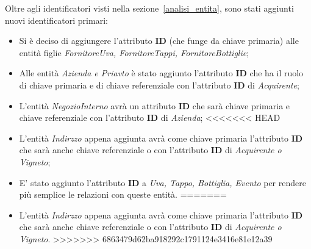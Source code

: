Oltre agli identificatori visti nella sezione~\ref{analisi_entita}, sono stati aggiunti nuovi identificatori primari:

\begin{itemize}
	\item Si è deciso di aggiungere l'attributo \textbf{ID} (che funge da chiave primaria) alle entità figlie \emph{FornitoreUva, FornitoreTappi, FornitoreBottiglie};
	\item Alle entità \emph{Azienda e Priavto} è stato aggiunto l'attributo \textbf{ID} che ha il ruolo di chiave primaria e di chiave referenziale con l'attributo \textbf{ID} di \emph{Acquirente};
	\item L'entità \emph{NegozioInterno} avrà un attributo \textbf{ID} che sarà chiave primaria e chiave referenziale con l'attributo \textbf{ID} di \emph{Azienda};
<<<<<<< HEAD
	\item L'entità \emph{Indirzzo} appena aggiunta avrà come chiave primaria l'attributo \textbf{ID} che sarà anche chiave referenziale o con l'attributo \textbf{ID} di \emph{Acquirente o Vigneto};
	\item E' stato aggiunto l'attributo \textbf{ID} a \emph{Uva, Tappo, Bottiglia, Evento} per rendere più semplice le relazioni con queste entità.
=======
	\item L'entità \emph{Indirzzo} appena aggiunta avrà come chiave primaria l'attributo \textbf{ID} che sarà anche chiave referenziale o con l'attributo \textbf{ID} di \emph{Acquirente o Vigneto}.
>>>>>>> 6863479d62ba918292c1791124e3416e81e12a39
\end{itemize}